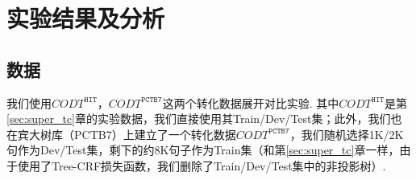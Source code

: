%

\section{实验结果及分析}
\subsection{数据}
我们使用$CODT^{\texttt{HIT}}$，$CODT^{\texttt{PCTB7}}$这两个转化数据展开对比实验. 其中$CODT^{\texttt{HIT}}$是第\ref{sec:super_tc}章的实验数据，我们直接使用其Train/Dev/Test集；此外，我们也在宾大树库（PCTB7）上建立了一个转化数据$CODT^{\texttt{PCTB7}}$，我们随机选择1K/2K句作为Dev/Test集，剩下的约8K句子作为Train集（和第\ref{sec:super_tc}章一样，由于使用了Tree-CRF损失函数，我们删除了Train/Dev/Test集中的非投影树）.

